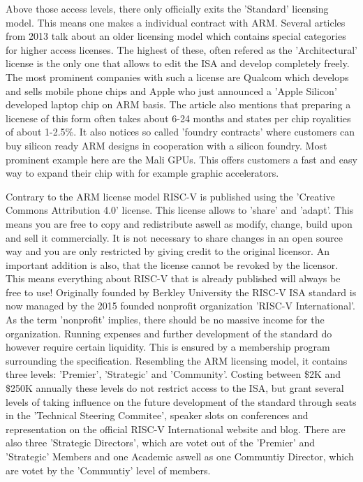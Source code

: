\documentclass[conference]{IEEEtran}
\begin{document}
	Above those access levels, there only officially exits the 'Standard' licensing model. This means one makes a individual contract with ARM.
	Several articles from 2013 \cite{Demerjian2013}\cite{Demerjian2013a} talk about an older licensing model which contains special categories for higher access licenses. The highest of these, often refered as the 'Architectural' license is the only one that allows to edit the \gls{ISA} and develop completely freely. The most prominent companies with such a license are Qualcom which develops and sells mobile phone chips and Apple who just announced a 'Apple Silicon' developed laptop chip on ARM basis. \cite{Apple2020} The article also mentions that preparing a licenese of this form often takes about 6-24 months and states per chip royalities of about 1-2.5\%. It also notices so called 'foundry contracts' where customers can buy silicon ready ARM designs in cooperation with a silicon foundry. Most prominent example here are the Mali GPUs. This offers customers a fast and easy way to expand their chip with for example graphic accelerators.

	Contrary to the ARM license model RISC-V is published using the 'Creative Commons Attribution 4.0' license. \cite{Waterman2017}\cite{Waterman2017a} This license allows to 'share' and 'adapt'. This means you are free to copy and redistribute aswell as modify, change, build upon and sell it commercially. It is not necessary to share changes in an open source way and you are only restricted by giving credit to the original licensor. \cite{CC} An important addition is also, that the license cannot be revoked by the licensor. This means everything about RISC-V that is already published will always be free to use!
	Originally founded by Berkley University the RISC-V \gls{ISA} standard is now managed by the 2015 founded nonprofit organization 'RISC-V International'. \cite{RVIAbout} As the term 'nonprofit' implies, there should be no massive income for the organization. Running expenses and further development of the standard do however require certain liquidity. This is ensured by a membership program surrounding the specification. \cite{RVIMem} Resembling the ARM licensing model, it contains three levels: 'Premier', 'Strategic' and 'Community'. Costing between \$2K and \$250K annually these levels do not restrict access to the \gls{ISA}, but grant several levels of taking influence on the future development of the standard through seats in the 'Technical Steering Commitee', speaker slots on conferences and representation on the official RISC-V International website and blog. There are also three 'Strategic Directors', which are votet out of the 'Premier' and 'Strategic' Members and one Academic aswell as one Communtiy Director, which are votet by the 'Communtiy' level of members. \cite{RVIAss}
\end{document}
